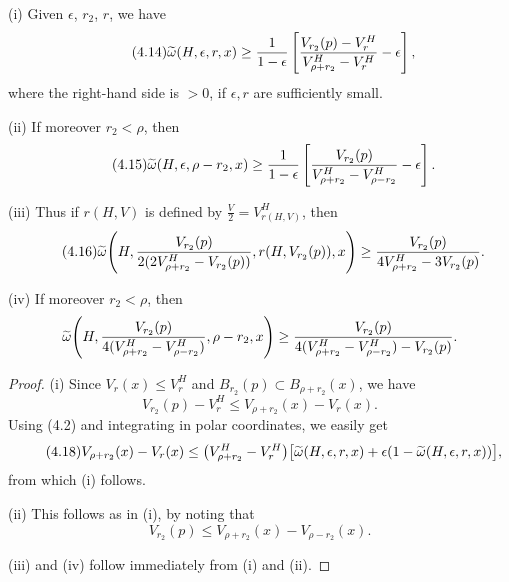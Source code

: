 \begin{proposition}
\label{prop:refined-injectivity-angle-lower-estimates}
\textup{(i)} Given $\epsilon$, $r_2$, $r$, we have
\begin{equation}\tag{4.14}
\widetilde{\omega}(H,\epsilon,r,x)\ge \frac{1}{1-\epsilon}
\left[\frac{V_{r_2}(p)-V_r^H}{V^H_{\rho+r_2}-V_r^H}-\epsilon\right],
\end{equation}
where the right-hand side is $>0$, if $\epsilon,r$ are sufficiently small.

\textup{(ii)} If moreover $r_2<\rho$, then
\begin{equation}\tag{4.15}
\widetilde{\omega}(H,\epsilon,\rho-r_2,x)\ge \frac{1}{1-\epsilon}
\left[\frac{V_{r_2}(p)}{V^H_{\rho+r_2}-V^H_{\rho-r_2}}-\epsilon\right].
\end{equation}

\textup{(iii)} Thus if $r(H,V)$ is defined by $\frac{V}{2}=V^H_{r(H,V)}$, then
\begin{equation}\tag{4.16}
\widetilde{\omega}\!\left(H,\frac{V_{r_2}(p)}{2(2V^H_{\rho+r_2}-V_{r_2}(p))},r(H,V_{r_2}(p)),x\right)
\ge \frac{V_{r_2}(p)}{4V^H_{\rho+r_2}-3V_{r_2}(p)}.
\end{equation}

\textup{(iv)} If moreover $r_2<\rho$, then
\[
\widetilde{\omega}\!\left(H,\frac{V_{r_2}(p)}{4(V^H_{\rho+r_2}-V^H_{\rho-r_2})},\rho-r_2,x\right)
\ge \frac{V_{r_2}(p)}{4(V^H_{\rho+r_2}-V_{\rho-r_2}^H)-V_{r_2}(p)}.
\]
\end{proposition}

\begin{proof}
\textup{(i)} Since $V_r(x)\le V_r^H$ and $B_{r_2}(p)\subset B_{\rho+r_2}(x)$, we have
\begin{equation}\tag{4.17}
V_{r_2}(p)-V_r^H\le V_{\rho+r_2}(x)-V_r(x).
\end{equation}
Using (4.2) and integrating in polar coordinates, we easily get
\begin{equation}\tag{4.18}
V_{\rho+r_2}(x)-V_r(x)\le
\bigl(V^H_{\rho+r_2}-V_r^H\bigr)\bigl[\widetilde{\omega}(H,\epsilon,r,x)+\epsilon(1-\widetilde{\omega}(H,\epsilon,r,x))\bigr],
\end{equation}
from which (i) follows.

\textup{(ii)} This follows as in (i), by noting that
\begin{equation}
\tag{4.19}
V_{r_2}(p) \leq V_{\rho+r_2}(x) - V_{\rho-r_2}(x).
\end{equation}

\textup{(iii)} and (iv) follow immediately from (i) and (ii).
\end{proof}

